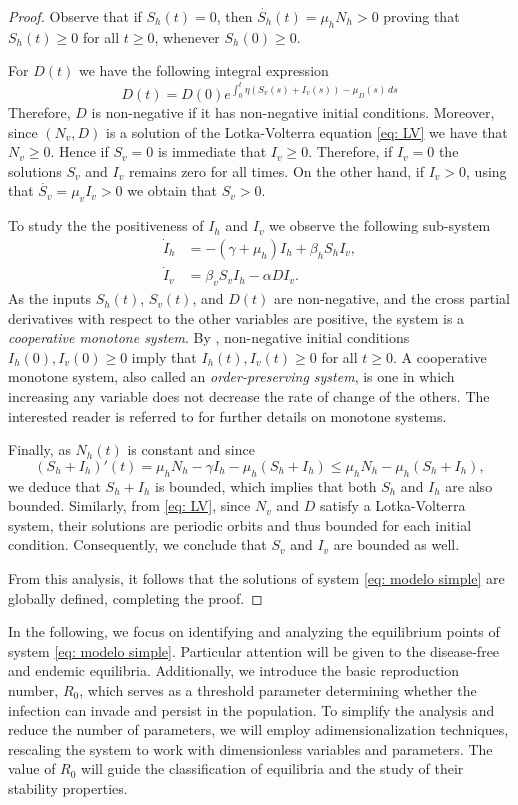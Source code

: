\documentclass{amsart}
\theoremstyle{definition}
\theoremstyle{remark}
\numberwithin{equation}{section}
\begin{document}
	\begin{proof}
		Observe that if $ S_h(t) = 0 $, then $ \dot{S_h}(t) = \mu_h N_h > 0 $ proving that $S_{h}(t)\ge 0$ for all $t\ge 0$, whenever $S_{h}(0)\ge 0$. 
		
		For $D(t)$ we have the following integral expression 
		$$D(t) = D(0)e^{\int_0^t  {\eta}(S_v(s)+I_v(s))-\mu_D(s)\,ds}$$ 
		Therefore, $ D $ is non-negative if it has non-negative initial conditions. Moreover, since $(N_v,D)$ is a solution of the Lotka-Volterra equation  \eqref{eq: LV} we have that $N_v\geq 0$. Hence if $S_v=0$ is immediate that $I_v\geq0$. Therefore, if $I_v=0$ the solutions $S_v$ and $I_v$ remains zero for all times. On the other hand, if $I_v>0$, using that $\dot{S_v}  = \mu_v I_v> 0$ we obtain that $S_v>0$.
		
		To study the the positiveness of $I_h$ and $I_v$ we observe the following sub-system 
		\begin{align*}
			\dot{I}_h& = - (\gamma + \mu_h) I_h + \beta_{h} S_h I_v,\\
			\dot{I}_v & = \beta_{v} S_v I_h -   \alpha D I_v.		
		\end{align*}
	As the inputs $S_h(t)$, $S_v(t)$, and $D(t)$ are non-negative, and the cross partial derivatives with respect to the other variables are positive, the system is a \emph{cooperative monotone system}. 
	By \cite[Proposition~1.1]{Smith1995}, non-negative initial conditions $I_h(0), I_v(0) \ge 0$ imply that $I_h(t), I_v(t) \ge 0$ for all $t \ge 0$. A cooperative monotone system, also called an \emph{order-preserving system}, is one in which increasing any variable does not decrease the rate of change of the others. 
	The interested reader is referred to \cite{Smith1995,SmithWaltman1995} for further details on monotone systems.
			
Finally, as $ N_h(t) $ is constant and since
$$
(S_h + I_h)'(t) = \mu_h N_h - \gamma I_h - \mu_h(S_h + I_h) \leq \mu_h N_h - \mu_h(S_h + I_h),
$$
we deduce that $ S_h + I_h $ is bounded, which implies that both $ S_h $ and $ I_h $ are also bounded. Similarly, from \eqref{eq: LV}, since $ N_v $ and $ D $ satisfy a Lotka-Volterra system, their solutions are periodic orbits and thus bounded for each initial condition. Consequently, we conclude that $ S_v $ and $ I_v $ are bounded as well.

From this analysis, it follows that the solutions of system \eqref{eq: modelo simple} are globally defined, completing the proof.


	\end{proof}
	In the following, we focus on identifying and analyzing the equilibrium points of system \eqref{eq: modelo simple}. Particular attention will be given to the disease-free and endemic equilibria. Additionally, we introduce the basic reproduction number, $R_0$, which serves as a threshold parameter determining whether the infection can invade and persist in the population. To simplify the analysis and reduce the number of parameters, we will employ adimensionalization techniques, rescaling the system to work with dimensionless variables and parameters. The value of $R_0$ will guide the classification of equilibria and the study of their stability properties.
	
\end{document}
